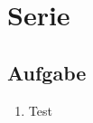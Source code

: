 \newpage
\section{Serie}

\subsection{Aufgabe}

\begin{enumerate}[label=(\alph*)]
    \item Test
\end{enumerate}